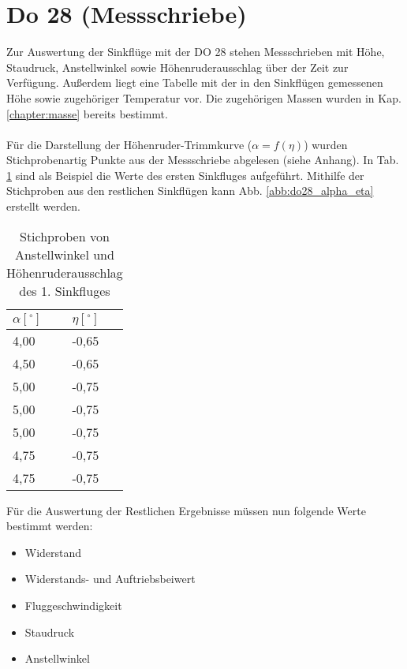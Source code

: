 \vspace{1cm}
\section{Do 28 (Messschriebe)}
Zur Auswertung der Sinkflüge mit der DO 28 stehen Messschrieben mit Höhe, Staudruck, Anstellwinkel sowie Höhenruderausschlag über der Zeit zur Verfügung. Außerdem liegt eine Tabelle mit der in den Sinkflügen gemessenen Höhe sowie zugehöriger Temperatur vor. Die zugehörigen Massen wurden in Kap. \ref{chapter:masse} bereits bestimmt.\\ \\
Für die Darstellung der Höhenruder-Trimmkurve ($\alpha = f(\eta)$) wurden Stichprobenartig Punkte aus der Messschriebe abgelesen (siehe Anhang). In Tab. \ref{tab:alphaetaDO28} sind als Beispiel die Werte des ersten Sinkfluges aufgeführt. Mithilfe der Stichproben aus den restlichen Sinkflügen kann Abb. \ref{abb:do28_alpha_eta} erstellt werden. 

\begin{table}[h]
	\centering
	\begin{tabular}{|l|l|}
		\hline
		$\alpha [^\circ]$ & $\eta [^\circ]$ \\ \hline
		4,00&	-0,65
\\ \hline
		4,50&	-0,65
\\ \hline
		5,00&	-0,75
\\ \hline
		5,00&	-0,75
\\ \hline
		5,00&	-0,75
\\ \hline
		4,75&	-0,75
\\ \hline
		4,75&	-0,75\\ \hline
	\end{tabular}
	\caption{Stichproben von Anstellwinkel und Höhenruderausschlag des 1. Sinkfluges} \label{tab:alphaetaDO28}
\end{table}
\vspace{1cm}
\noindent Für die Auswertung der Restlichen Ergebnisse müssen nun folgende Werte bestimmt werden:

\begin{itemize}
	\item Widerstand
	\item Widerstands- und Auftriebsbeiwert
	\item Fluggeschwindigkeit
	\item Staudruck
	\item Anstellwinkel
\end{itemize} 

